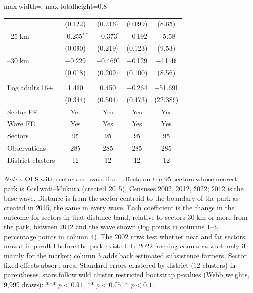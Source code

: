 \documentclass[11pt]{article}
\begin{document}
\begin{table}[H]
\begin{adjustbox}{max width=\textwidth, max totalheight=0.8\textheight}
\begin{tabular}{lcccc}
 & (0.122) & (0.216) & (0.099) & (8.65) \\
\quad 20--25 km & $-$0.255$^{**}$ & $-$0.373$^{*}$ & $-$0.192 & $-$5.58 \\
 & (0.090) & (0.219) & (0.123) & (9.53) \\
\quad 25--30 km & $-$0.229 & $-$0.469$^{*}$ & $-$0.129 & $-$11.46 \\
 & (0.078) & (0.209) & (0.100) & (8.56) \\
\addlinespace
\multicolumn{5}{l}{\textit{Controls}} \\
\quad Log adults 16+ & 1.480 & 0.450 & $-$0.264 & $-$51.691 \\
 & (0.344) & (0.504) & (0.473) & (22.389) \\
\midrule
Sector FE & Yes & Yes & Yes & Yes \\
Wave FE & Yes & Yes & Yes & Yes \\
Sectors & 95 & 95 & 95 & 95 \\
Observations & 285 & 285 & 285 & 285 \\
District clusters & 12 & 12 & 12 & 12 \\
\bottomrule
\end{tabular}
\end{adjustbox}
\begin{minipage}{0.97\textwidth}\scriptsize
\textit{Notes:} OLS with sector and wave fixed effects on the 95 sectors whose nearest park is Gishwati--Mukura (created 2015), Censuses 2002, 2012, 2022; 2012 is the base wave. Distance is from the sector centroid to the boundary of the park as created in 2015, the same in every wave. Each coefficient is the change in the outcome for sectors in that distance band, relative to sectors 30 km or more from the park, between 2012 and the wave shown (log points in columns 1--3, percentage points in column 4). The 2002 rows test whether near and far sectors moved in parallel before the park existed. In 2022 farming counts as work only if mainly for the market; column 3 adds back estimated subsistence farmers. Sector fixed effects absorb area. Standard errors clustered by district (12 clusters) in parentheses; stars follow wild cluster restricted bootstrap p-values (Webb weights, 9,999 draws): *** $p<0.01$, ** $p<0.05$, * $p<0.1$.
\end{minipage}
\end{table}
\clearpage
\end{document}
